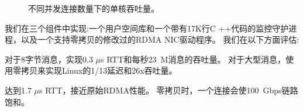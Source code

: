\begin{figure}[htbp]
		\centering
		
		\caption{不同并发连接数量下的单核吞吐量。}
		\label{socksdirect:fig:eval-connnum-tput}
\end{figure}


我们在三个组件中实现\sys :一个用户空间库\libipc {}和一个带有17K行C ++代码的监控守护进程，以及一个支持零拷贝的修改过的RDMA NIC驱动程序。 我们在以下方面评估\sys :

对于8字节消息，\sys 实现0.3 $\mu$s RTT和每秒23~M消息的吞吐量。 对于大型消息，\sys 使用零拷贝来实现Linux的1/13延迟和26x吞吐量。

\sys 达到1.7 $\mu$s RTT，接近原始RDMA性能。
零拷贝时，一个连接会使100~Gbps链路饱和。

